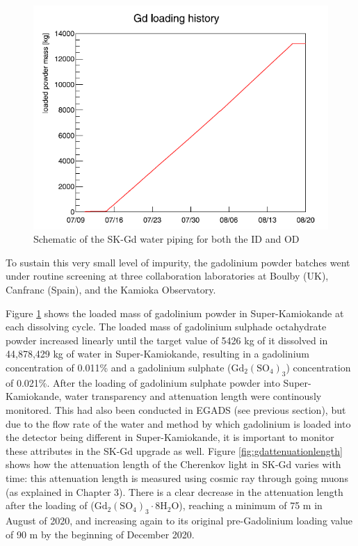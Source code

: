 \begin{figure}[H]
    \includegraphics[width=\textwidth]{Figures/gdloadinghistory.png}
    \caption{Schematic of the SK-Gd water piping for both the ID and OD}
    \label{fig:gdloadinghistory}
\end{figure}

To sustain this very small level of impurity, the gadolinium powder batches went under routine screening at three collaboration laboratories at Boulby (UK), Canfranc (Spain), and the Kamioka Observatory. 

Figure \ref{fig:gdloadinghistory} shows the loaded mass of gadolinium powder in Super-Kamiokande at each dissolving cycle. The loaded mass of gadolinium sulphade octahydrate powder increased linearly until the target value of 5426 kg of it dissolved in 44,878,429 kg of water in Super-Kamiokande, resulting in a gadolinium concentration of 0.011\% and a gadolinium sulphate ($\mathrm{Gd}_{2}\left(\mathrm{SO}_{4}\right)_{3}$) concentration of 0.021\%. After the loading of gadolinium sulphate powder into Super-Kamiokande, water transparency and attenuation length were continously monitored. This had also been conducted in EGADS (see previous section), but due to the flow rate of the water and method by which gadolinium is loaded into the detector being different in Super-Kamiokande, it is important to monitor these attributes in the SK-Gd upgrade as well. Figure \ref{fig:gdattenuationlength} shows how the attenuation length of the Cherenkov light in SK-Gd varies with time: this attenuation length is measured using cosmic ray through going muons (as explained in Chapter 3). There is a clear decrease in the attenuation length after the loading of ($
\mathrm{Gd}_{2}\left(\mathrm{SO}_{4}\right)_{3} \cdot 8 \mathrm{H}_{2} \mathrm{O}
$), reaching a minimum of 75 m in August of 2020, and increasing again to its original pre-Gadolinium loading value of 90 m by the beginning of December 2020.  
\newline

